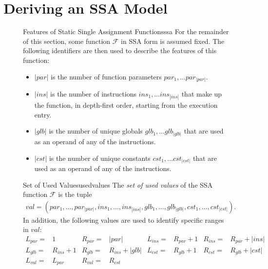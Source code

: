 \section{Deriving an SSA Model}

\begin{figure}[p]
\begin{definition}{Features of Static Single Assignment Functions}{ssa}
    For the remainder of this section, some function $\mathcal F$ in SSA form is
    assumed fixed. 
    The following identifiers are then used to describe the features of this
    function:

    \begin{itemize}[topsep=0pt,itemsep=0pt,partopsep=0pt,parsep=0pt]
    \item $|par|$ is the number of function parameters
          $par_1,\dots par_{|par|}$.
    \item $|ins|$ is the number of instructions $ins_1,\dots ins_{|ins|}$ that
          make up the function, in depth-first order, starting from the
          execution entry.
    \item $|glb|$ is the number of unique globals $glb_1,\dots glb_{|glb|}$ that
          are used as an operand of any of the instructions.
    \item $|cst|$ is the number of unique constants $cst_1,\dots cst_{|cst|}$
          that are used as an operand of any of the instructions.
    \end{itemize}
\end{definition}
\begin{definition}{Set of Used Values}{usedvalues}
    The {\em set of used values} of the SSA function $\mathcal F$ is the tuple
    \begin{align*}
       val = (par_1,\dots,par_{|par|},
              ins_1,\dots,ins_{|ins|},
              glb_1,\dots,glb_{|glb|},
              cst_1,\dots,cst_{|cst|}).
    \end{align*}
    In addition, the following values are used to identify specific ranges in
    $val$:
    \begin{align*}
        L_{par}={}&1         & R_{par}={}&|par| &
        L_{ins}={}&R_{par}+1 & R_{ins}={}&R_{par}+|ins|\\[-1.5mm]
        L_{glb}={}&R_{ins}+1 & R_{glb}={}&R_{ins}+|glb| &
        L_{cst}={}&R_{glb}+1 & R_{cst}={}&R_{glb}+|cst|\\[-1.5mm]
        L_{val}={}&L_{par}   & R_{val}={}&R_{cst} &&&&
    \end{align*}
\end{definition}

\end{figure}
